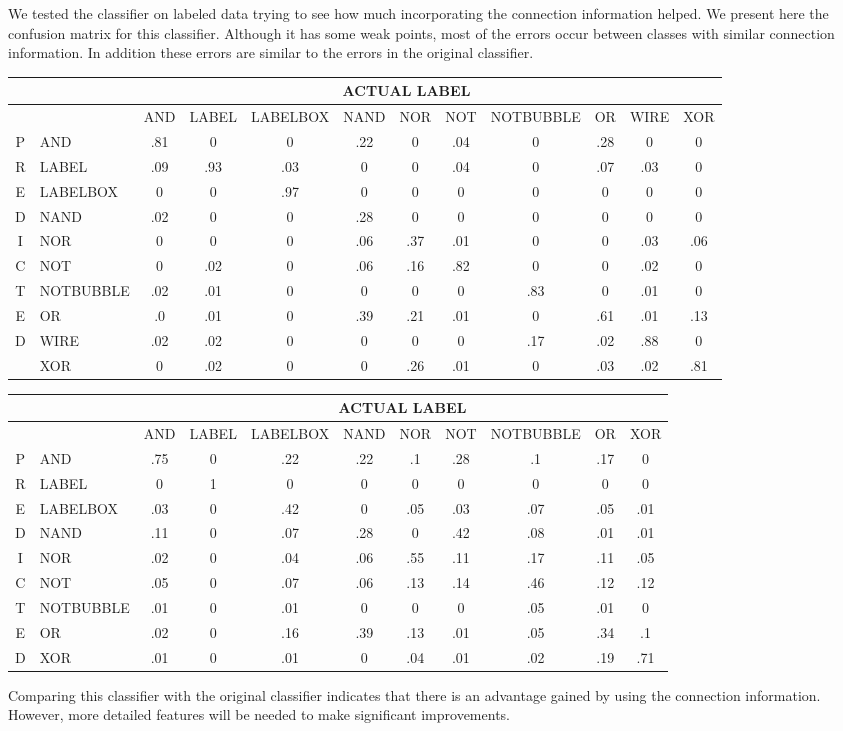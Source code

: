 \documentclass{article}
\begin{document}
We tested the classifier on labeled data trying to see how much incorporating the connection information helped.  We present here the confusion matrix for this classifier.  Although it has some weak points, most of the errors occur between classes with similar connection information.  In addition these errors are similar to the errors in the original classifier.
\begin{center}
\begin{tabular}{|c|l|c|c|c|c|c|c|c|c|c|c|}
\hline
&&\multicolumn{9}{c}{ACTUAL LABEL}\\
\hline
&&\tiny{AND}&\tiny{LABEL}&\tiny{LABELBOX}&\tiny{NAND}&\tiny{NOR}&\tiny{NOT}&\tiny{NOTBUBBLE}&\tiny{OR}&\tiny{WIRE}&\tiny{XOR}\\
\hline
P&\tiny{AND}&.81&0&0&.22&0&.04&0&.28&0&0\\
R&\tiny{LABEL}&.09&.93&.03&0&0&.04&0&.07&.03&0\\
E&\tiny{LABELBOX}&0&0&.97&0&0&0&0&0&0&0\\
D&\tiny{NAND}&.02&0&0&.28&0&0&0&0&0&0\\
I&\tiny{NOR}&0&0&0&.06&.37&.01&0&0&.03&.06\\
C&\tiny{NOT}&0&.02&0&.06&.16&.82&0&0&.02&0\\
T&\tiny{NOTBUBBLE}&.02&.01&0&0&0&0&.83&0&.01&0\\
E&\tiny{OR}&.0&.01&0&.39&.21&.01&0&.61&.01&.13\\
D&\tiny{WIRE}&.02&.02&0&0&0&0&.17&.02&.88&0\\
&\tiny{XOR}&0&.02&0&0&.26&.01&0&.03&.02&.81\\
\hline
\end{tabular}
\end{center}


\begin{center}
\begin{tabular}{|c|l|c|c|c|c|c|c|c|c|c|}
\hline
&&\multicolumn{9}{c}{ACTUAL LABEL}\\
\hline
&&\tiny{AND}&\tiny{LABEL}&\tiny{LABELBOX}&\tiny{NAND}&\tiny{NOR}&\tiny{NOT}&\tiny{NOTBUBBLE}&\tiny{OR}&\tiny{XOR}\\
\hline
P&\tiny{AND}       &.75&  0&.22&.22&.1 &.28&.1 &.17&0  \\
R&\tiny{LABEL}     &0  &1  &0  &0  &0  &0  &0  &0  &0  \\
E&\tiny{LABELBOX}  &.03&0  &.42&0  &.05&.03&.07&.05&.01\\
D&\tiny{NAND}      &.11&0  &.07&.28&0  &.42&.08&.01&.01\\
I&\tiny{NOR}       &.02&0  &.04&.06&.55&.11&.17&.11&.05\\
C&\tiny{NOT}       &.05&0  &.07&.06&.13&.14&.46&.12&.12\\
T&\tiny{NOTBUBBLE} &.01&0  &.01&0  &0  &0  &.05&.01&0  \\
E&\tiny{OR}        &.02&0  &.16&.39&.13&.01&.05&.34&.1 \\
D&\tiny{XOR}       &.01&0  &.01&0  &.04&.01&.02&.19&.71\\
\hline
\end{tabular}
\end{center}
Comparing this classifier with the original classifier indicates that there is an advantage gained by using the connection information.  However, more detailed features will be needed to make significant improvements.
\end{document}
